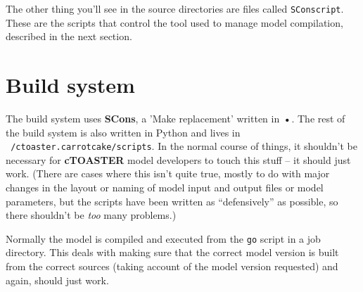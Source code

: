 \documentclass[a4paper,10pt,article]{memoir}
\begin{document}
The other thing you'll see in the source directories are files called
\texttt{SConscript}.  These are the scripts that control the tool used
to manage model compilation, described in the next section.

\section{Build system}
\label{sec:build-system}

The build system uses \textbf{SCons}, a 'Make replacement' written in
\textbf{•}.  The rest of the build system is also written in Python
and lives in \texttt{~/ctoaster.carrotcake/scripts}.  In the normal course of
things, it shouldn't be necessary for \textbf{cTOASTER} model developers to touch
this stuff -- it should just work.  (There are cases where this isn't
quite true, mostly to do with major changes in the layout or naming of
model input and output files or model parameters, but the scripts have
been written as ``defensively'' as possible, so there shouldn't be
\emph{too} many problems.)

Normally the model is compiled and executed from the \texttt{go}
script in a job directory.  This deals with making sure that the
correct model version is built from the correct sources (taking
account of the model version requested) and again, should just work.
\end{document}
